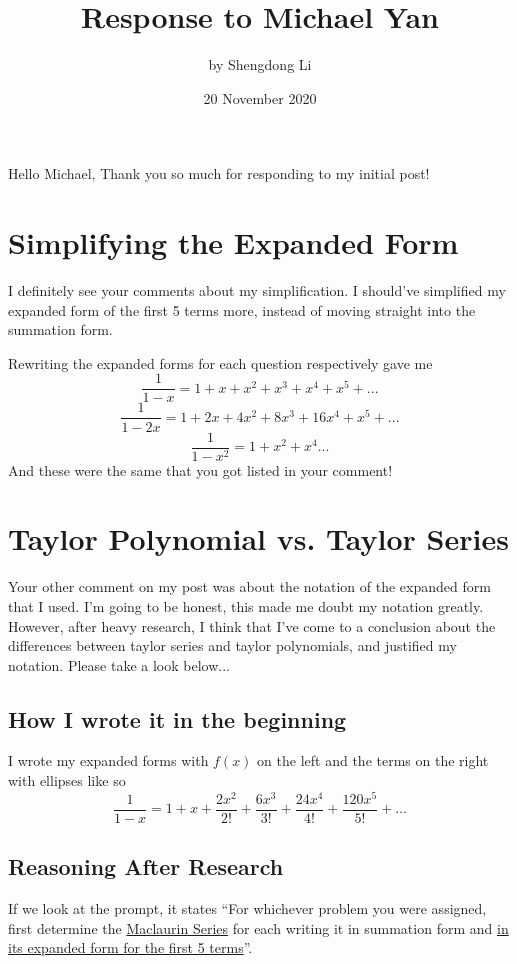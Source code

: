 \documentclass[12pt]{article}
\begin{document}
\title{Response to Michael Yan}
\author{by Shengdong Li}
\date{20 November 2020}
\maketitle

Hello Michael,
Thank you so much for responding to my initial post!

\section{Simplifying the Expanded Form}
I definitely see your comments about my simplification. I should've simplified my expanded form of the first 5 terms more, instead of moving straight into the summation form.

Rewriting the expanded forms for each question respectively gave me
$$
  \frac{1}{1-x}=1+x+x^2+x^3+x^4+x^5+...
$$
$$
  \frac{1}{1-2x}=1+2x+4x^2+8x^3+16x^4+x^5+...
$$
$$
  \frac{1}{1-x^2}=1+x^2+x^4...
$$
And these were the same that you got listed in your comment!

\section{Taylor Polynomial vs. Taylor Series}
Your other comment on my post was about the notation of the expanded form that I used. I'm going to be honest, this made me doubt my notation greatly. However, after heavy research, I think that I've come to a conclusion about the differences between taylor series and taylor polynomials, and justified my notation. Please take a look below...

\subsection{How I wrote it in the beginning}
I wrote my expanded forms with $f(x)$ on the left and the terms on the right with ellipses like so
$$
  \frac{1}{1-x}=1+x+\frac{2x^{2}}{2!}+\frac{6x^{3}}{3!}+\frac{24x^{4}}{4!}+\frac{120x^{5}}{5!}+\ldots
$$

\subsection{Reasoning After Research}
If we look at the prompt, it states ``For whichever problem you were assigned, first determine the \uline{Maclaurin Series} for each writing it in summation form and \uline{in its expanded form for the first 5 terms}''.
\end{document}
